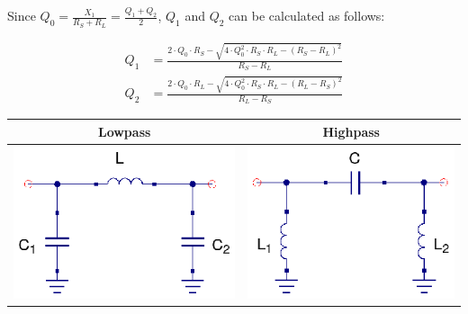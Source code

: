 \noindent Since $Q_0 = \frac{X_1}{R_S + R_L} = \frac{Q_1 + Q_2}{2}$, $Q_1$ and $Q_2$ can be calculated as follows:
 
\begin{align}
       Q_1 &= \frac{2 \cdot Q_0 \cdot R_S - \sqrt{4 \cdot Q_0^2 \cdot R_S \cdot R_L - (R_S - R_L)^2}}{R_S - R_L}\\
       Q_2 &= \frac{2 \cdot Q_0 \cdot R_L - \sqrt{4 \cdot Q_0^2 \cdot R_S \cdot R_L - (R_L - R_S)^2}}{R_L - R_S}
\end{align}

\begin{table}[H]
  \centering
  \begin{tabular}{ | c | c | }
    \hline
    Lowpass & Highpass\\ \hline
    \begin{minipage}{.4\textwidth}
      \includegraphics[width=\linewidth]{Lowpass-Pi}
    \end{minipage}
    &
    \begin{minipage}{.4\textwidth}
      \includegraphics[width=\linewidth]{Highpass-Pi}

\end{minipage}
\end{tabular}
\end{table}
